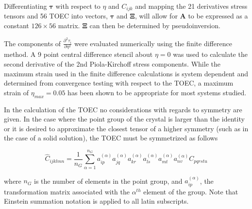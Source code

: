 \documentclass[showpacs,floatfix,aps,prb,preprint,superscriptaddress]{revtex4-1}
\begin{document}
\noindent Differentiating $\bm{\tau}$ with respect to $\eta$ and $C_{ijk}$ and mapping the 21 derivatives stress tensors and 56 TOEC into vectors, $\bm{\tau}$ and $\bm{\Xi}$, will allow for $\bm{A}$ to be expressed as a constant $126\times 56$ matrix.  $\bm{\Xi}$ can then be determined by pseudoinversion.

The components of $\frac{\partial^2\tau_i}{\partial \eta^2}$ were evaluated numerically using the finite difference method.  A 9 point central difference stencil about $\eta=0$ was used to calculate the second derivative of the 2nd Piola-Kirchoff stress components.    While the maximum strain used in the finite difference calculations is system dependent and determined from convergence testing with respect to the TOEC, a maximum strain of $\eta_{max} = 0.05$ has been shown to be appropriate for most systems studied.

In the calculation of the TOEC no considerations with regards to symmetry are given.  In the case where the point group of the crystal is larger than the identity or it is desired to approximate the closest tensor of a higher symmetry (such as in the case of a solid solution), the TOEC must be symmetrized as follows

\begin{equation}
\hat{C}_{ijklmn} = \frac{1}{n_G} \sum\limits_{\alpha=1}^{n_G}  a^{(\alpha)}_{ip}  a^{(\alpha)}_{jq}  a^{(\alpha)}_{kr}  a^{(\alpha)}_{ls}  a^{(\alpha)}_{mt}  a^{(\alpha)}_{nv} C_{pqrstu}
\end{equation}

where $n_G$ is the number of elements in the point group, and $a_{ip}^{(\alpha)}$, the transformation matrix associated with the $\alpha^{th}$ element of the group.  Note that Einstein summation notation is applied to all latin subscripts.
\end{document}
